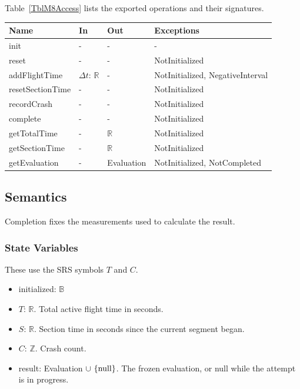 \documentclass[12pt, titlepage]{article}
\newcommand{\nul}{\textnormal{null}}
\begin{document}
Table~\ref{TblM8Access} lists the exported operations and their signatures.

\begin{center}
\begin{minipage}{\textwidth}
\begin{tabularx}{\textwidth}{p{3.4cm} p{2.4cm} p{2.6cm} X}
\toprule
\textbf{Name} & \textbf{In} & \textbf{Out} & \textbf{Exceptions} \\
\midrule
init & - & - & - \\
reset & - & - & NotInitialized \\
addFlightTime & $\Delta t$: $\mathbb{R}$ & - & NotInitialized, NegativeInterval
\\
resetSectionTime & - & - & NotInitialized \\
recordCrash & - & - & NotInitialized \\
complete & - & - & NotInitialized \\
getTotalTime & - & $\mathbb{R}$ & NotInitialized \\
getSectionTime & - & $\mathbb{R}$ & NotInitialized \\
getEvaluation & - & Evaluation & NotInitialized, NotCompleted \\
\bottomrule
\end{tabularx}
\label{TblM8Access}
\end{minipage}
\end{center}

\subsection{Semantics}

Completion fixes the measurements used to calculate the result.

\subsubsection{State Variables}

These use the SRS symbols $T$ and $C$.

\begin{itemize}
\item initialized: $\mathbb{B}$
\item $T$: $\mathbb{R}$. Total active flight time in seconds.
\item $S$: $\mathbb{R}$. Section time in seconds since the current segment
  began.
\item $C$: $\mathbb{Z}$. Crash count.
\item result: Evaluation $\cup \ \{\nul\}$. The frozen evaluation, or \nul{}
  while the attempt is in progress.
\end{itemize}
\end{document}
